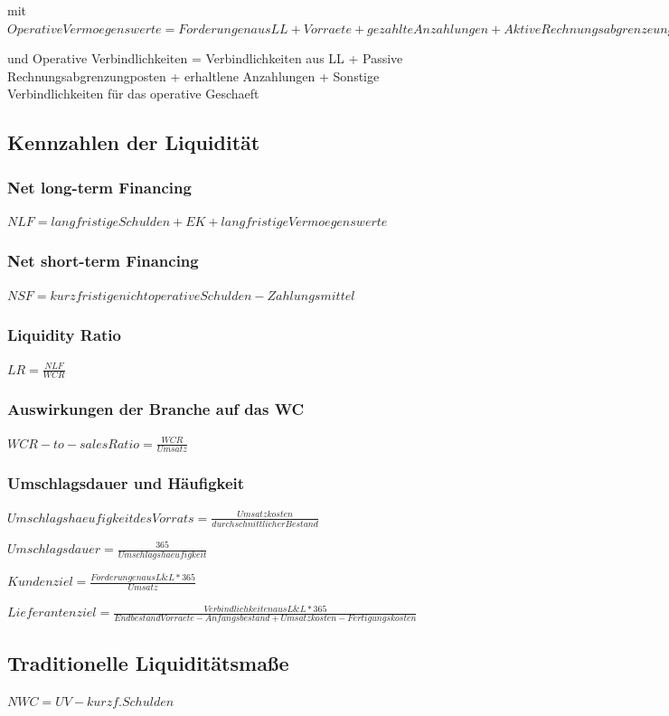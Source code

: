 \documentclass{article}
\begin{document}
mit $ Operative Vermoegenswerte = Forderungen aus LL + Vorraete + gezahlte Anzahlungen + Aktive Rechnungsabgrenzeungsposten$

und  Operative Verbindlichkeiten = Verbindlichkeiten aus LL + Passive Rechnungsabgrenzungposten + erhaltlene Anzahlungen + Sonstige Verbindlichkeiten für das operative Geschaeft 

\subsection{Kennzahlen der Liquidität}
\subsubsection{Net long-term Financing}
$NLF = langfristige Schulden + EK + langfristige Vermoegenswerte$

\subsubsection{Net short-term Financing}
$NSF = kurzfristige nichtoperative Schulden - Zahlungsmittel $

\subsubsection{Liquidity Ratio}
$LR = \frac{NLF}{WCR}$

\subsubsection{Auswirkungen der Branche auf das WC}

$WCR-to-sales Ratio = \frac{WCR}{Umsatz}$


\subsubsection{Umschlagsdauer und Häufigkeit}

$Umschlagshaeufigkeit des Vorrats = \frac{Umsatzkosten}{durchschnittlicher Bestand}$

$Umschlagsdauer = \frac{365}{Umschlagshaeufigkeit}$

$Kundenziel = \frac{Forderungen aus L\&L * 365}{Umsatz} $

$Lieferantenziel = \frac{Verbindlichkeiten aus L\&L * 365}{Endbestand Vorraete - Anfangsbestand + Umsatzkosten - Fertigungskosten}$

\subsection{Traditionelle Liquiditätsmaße}
$NWC = UV - kurzf. Schulden$
\end{document}
